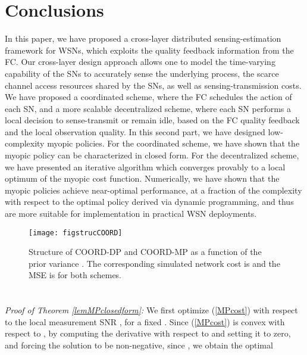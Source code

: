 \documentclass[10pt,twocolumn,twoside]{IEEEtran}
\theoremstyle{plain}
\begin{document}
\section{Conclusions}\label{conclusions}
 \noindent In this paper, we have proposed a cross-layer distributed sensing-estimation framework for WSNs,
 which exploits the quality feedback information from the FC.
 Our cross-layer design approach allows one to model the time-varying capability 
 of the SNs to accurately sense the underlying process,
  the scarce channel access resources shared by the SNs, as well as sensing-transmission costs.
We have proposed a coordinated scheme, where the FC schedules the action of each SN,
 and a more scalable decentralized scheme, where each SN performs a local decision to sense-transmit or remain idle, based on the FC quality feedback and
 the local observation quality.
  In this second part, we have designed low-complexity myopic policies.
For the coordinated scheme, we have shown that the myopic policy can be characterized in closed form. For the decentralized scheme, we have presented an iterative algorithm which converges provably to a local optimum of the myopic cost function.
Numerically, we have shown that the myopic policies achieve near-optimal performance,
 at a fraction of the complexity with respect to the optimal policy derived via dynamic programming,
 and thus are more suitable for implementation in practical WSN deployments.




\begin{figure}[t]
\centering
\texttt{[image: figstrucCOORD]}
\vspace{-3mm}
\caption{Structure of COORD-DP and  COORD-MP  as a function of the prior variance .
The corresponding simulated network cost is  and the MSE is  for both schemes.}\vspace{-5mm}
\label{figstructCOORD}
\end{figure}


\appendices
\vspace{-3mm}
\section{}
\label{proofoflemMPclosedform}
\noindent\emph{Proof of Theorem \ref{lemMPclosedform}:}
We first optimize (\ref{MPcost}) with respect to the local measurement SNR , for a fixed .
Since (\ref{MPcost}) is convex with respect to , by computing the derivative with respect to
 and setting it to zero, and forcing the solution to be non-negative, since , we obtain the optimal 
\end{document}

